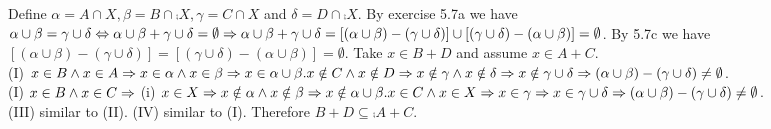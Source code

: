 \documentclass[12pt]{book}
\begin{document}
\begin{enumerate}
{Define $\alpha = A \cap X, \beta = B \cap \comp{X}, \gamma = C \cap X$ and $\delta = D \cap \comp{X}$. By exercise 5.7a we have $\alpha \cup \beta = \gamma \cup \delta \Leftrightarrow \alpha \cup \beta + \gamma \cup \delta = \emptyset \Rightarrow \alpha \cup \beta + \gamma \cup \delta = [(\alpha \cup \beta) - (\gamma \cup \delta)] \cup [(\gamma \cup \delta) - (\alpha \cup \beta)] = \emptyset$. By 5.7c we have $[(\alpha \cup \beta) - (\gamma \cup \delta)] = [(\gamma \cup \delta) - (\alpha \cup \beta)] = \emptyset$. Take $x \in B + D$ and assume $x \in A + C$.\\(I) $x \in B \land x \in A \Rightarrow x \in \alpha \land x \in \beta \Rightarrow x \in \alpha \cup \beta. x \notin C \land x \notin D \Rightarrow x \notin \gamma \land x \notin \delta \Rightarrow x \notin \gamma \cup \delta \Rightarrow (\alpha \cup \beta) - (\gamma \cup \delta) \neq \emptyset$.\\
(I) $x \in B \land x \in C \Rightarrow$ (i) $x \in X \Rightarrow x \notin \alpha \land x \notin \beta \Rightarrow x \notin \alpha \cup \beta. x \in C \land x \in X \Rightarrow x \in \gamma \Rightarrow x \in \gamma \cup \delta \Rightarrow (\alpha \cup \beta) - (\gamma \cup \delta) \neq \emptyset$.\\(III) similar to (II). (IV) similar to (I). Therefore $B + D \subseteq \comp{A+C}$.}
\end{enumerate}

\hrulefill
\end{document}
